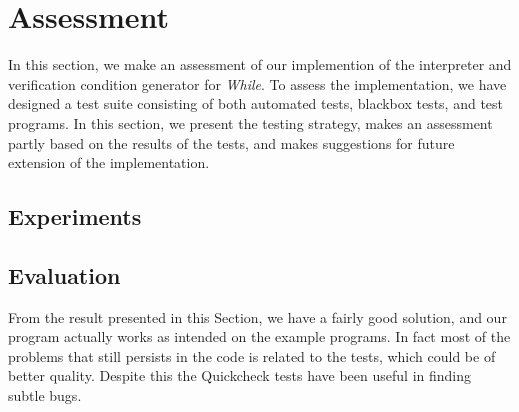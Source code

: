 \section{Assessment}
In this section, we make an assessment of our implemention of the interpreter and verification condition generator for \textit{While}. To assess the implementation, we have designed a test suite consisting of both automated tests, blackbox tests, and test programs.
In this section, we present the testing strategy, makes an assessment partly based on the results of the tests, and makes suggestions for future extension of the implementation.

\subsection{Experiments}


\subsection{Evaluation}
From the result presented in this Section, we have a fairly good solution, and our program actually works as intended on the example programs.
In fact most of the problems that still persists in the code is related to the tests, which could be of better quality. Despite this the Quickcheck tests have been useful in finding subtle bugs.

